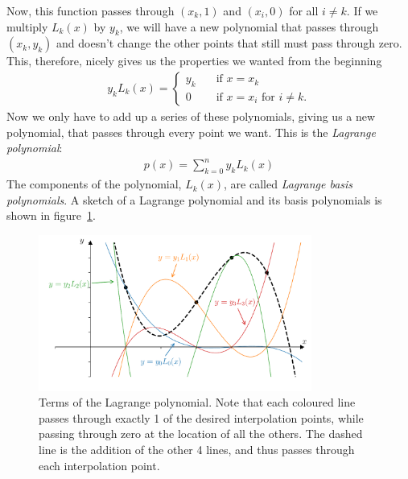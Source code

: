 Now, this function passes through $(x_k,1)$ and $(x_i,0)$ for all $i\neq k$. If we multiply $L_k(x)$ by $y_k$, we will have a new polynomial that passes through $(x_k,y_k)$ and doesn't change the other points that still must pass through zero. This, therefore, nicely gives us the properties we wanted from the beginning 
\begin{align*}
y_k L_k(x) = 
\begin{cases}
y_k & \quad \text{if } x=x_k \\
0 & \quad \text{if } x=x_i \text{ for } i\neq k. 
\end{cases}
\end{align*} 
Now we only have to add up a series of these polynomials, giving us a new polynomial, that passes through every point we want. This is the \textit{Lagrange polynomial}:
\begin{align*}
\boxed{p(x) = \sum_{k=0}^n y_k L_k(x)}
\end{align*}
The components of the polynomial, $L_k(x)$, are called \textit{Lagrange basis polynomials}. A sketch of a Lagrange polynomial and its basis polynomials is shown in figure~\ref{fig:ch3_lagrange_total}.
\begin{figure}[H]
	\begin{center}
	\includegraphics[width=0.8\textwidth]{figures/ch3_lagrange_total.pdf} 
	  \caption{Terms of the Lagrange polynomial. Note that each coloured line passes through exactly 1 of the desired interpolation points, while passing through zero at the location of all the others. The dashed line is the addition of the other 4 lines, and thus passes through each interpolation point.} \label{fig:ch3_lagrange_total}
	\end{center}
\end{figure}

